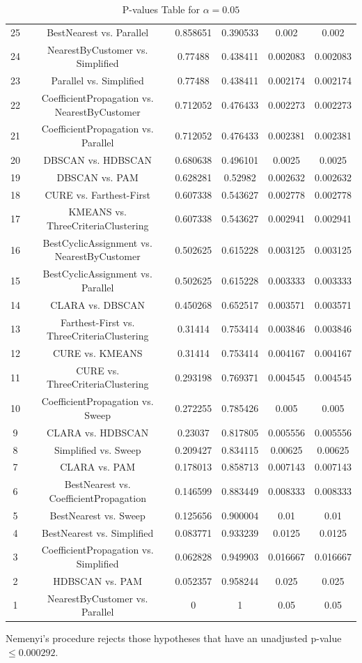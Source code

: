 \documentclass[a4paper,10pt]{article}
\begin{document}
\begin{landscape}
\begin{table}[!htp]
\begin{tabular}{cccccc}
25&BestNearest vs. Parallel&0.858651&0.390533&0.002&0.002\\
24&NearestByCustomer vs. Simplified&0.77488&0.438411&0.002083&0.002083\\
23&Parallel vs. Simplified&0.77488&0.438411&0.002174&0.002174\\
22&CoefficientPropagation vs. NearestByCustomer&0.712052&0.476433&0.002273&0.002273\\
21&CoefficientPropagation vs. Parallel&0.712052&0.476433&0.002381&0.002381\\
20&DBSCAN vs. HDBSCAN&0.680638&0.496101&0.0025&0.0025\\
19&DBSCAN vs. PAM&0.628281&0.52982&0.002632&0.002632\\
18&CURE vs. Farthest-First&0.607338&0.543627&0.002778&0.002778\\
17&KMEANS vs. ThreeCriteriaClustering&0.607338&0.543627&0.002941&0.002941\\
16&BestCyclicAssignment vs. NearestByCustomer&0.502625&0.615228&0.003125&0.003125\\
15&BestCyclicAssignment vs. Parallel&0.502625&0.615228&0.003333&0.003333\\
14&CLARA vs. DBSCAN&0.450268&0.652517&0.003571&0.003571\\
13&Farthest-First vs. ThreeCriteriaClustering&0.31414&0.753414&0.003846&0.003846\\
12&CURE vs. KMEANS&0.31414&0.753414&0.004167&0.004167\\
11&CURE vs. ThreeCriteriaClustering&0.293198&0.769371&0.004545&0.004545\\
10&CoefficientPropagation vs. Sweep&0.272255&0.785426&0.005&0.005\\
9&CLARA vs. HDBSCAN&0.23037&0.817805&0.005556&0.005556\\
8&Simplified vs. Sweep&0.209427&0.834115&0.00625&0.00625\\
7&CLARA vs. PAM&0.178013&0.858713&0.007143&0.007143\\
6&BestNearest vs. CoefficientPropagation&0.146599&0.883449&0.008333&0.008333\\
5&BestNearest vs. Sweep&0.125656&0.900004&0.01&0.01\\
4&BestNearest vs. Simplified&0.083771&0.933239&0.0125&0.0125\\
3&CoefficientPropagation vs. Simplified&0.062828&0.949903&0.016667&0.016667\\
2&HDBSCAN vs. PAM&0.052357&0.958244&0.025&0.025\\
1&NearestByCustomer vs. Parallel&0&1&0.05&0.05\\
\hline
\end{tabular}
\caption{P-values Table for $\alpha=0.05$}
\end{table}Nemenyi's procedure rejects those hypotheses that have an unadjusted p-value $\le0.000292$.


\end{landscape}
\end{document}
